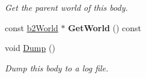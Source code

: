 \begin{DoxyCompactItemize}
\begin{DoxyCompactList}\small\item\em Get the parent world of this body. \end{DoxyCompactList}\item 
const \hyperlink{classb2_world}{b2\+World} $\ast$ {\bfseries Get\+World} () const \hypertarget{classb2_body_aee495ab2131b3123e0cfc5ed106b2fda}{}\label{classb2_body_aee495ab2131b3123e0cfc5ed106b2fda}

\item 
void \hyperlink{classb2_body_ac9e482f7d9df92801c24e79a7e751d06}{Dump} ()\hypertarget{classb2_body_ac9e482f7d9df92801c24e79a7e751d06}{}\label{classb2_body_ac9e482f7d9df92801c24e79a7e751d06}

\begin{DoxyCompactList}\small\item\em Dump this body to a log file. \end{DoxyCompactList}\end{DoxyCompactItemize}
